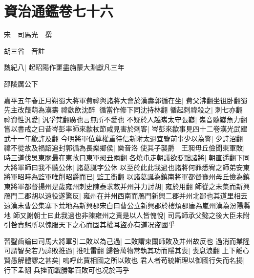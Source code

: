 \section{資治通鑑卷七十六}
宋　司馬光　撰

胡三省　音註

魏紀八|{
	起昭陽作噩盡旃蒙大淵獻凡三年}


邵陵厲公下

嘉平五年春正月朔蜀大將軍費禕與諸將大會於漢夀郭循在坐|{
	費父沸翻坐徂卧翻蜀先主改葭萌為漢夀}
禕歡飲沈醉|{
	循當作修下同沈持林翻}
循起刺禕殺之|{
	刺七亦翻}
禕資性汎愛|{
	汎孚梵翻廣也言無所不愛也}
不疑於人越嶲太守張嶷|{
	嶲音髓嶷魚力翻}
嘗以書戒之曰昔岑彭率師來歙杖節咸見害於刺客|{
	岑彭來歙事見四十二卷漢光武建武十一年歙許及翻}
今明將軍位尊權重待信新附太過宜鑒前事少以為警|{
	少詩沼翻}
禕不從故及禍詔追封郭循為長樂鄉侯|{
	樂音洛}
使其子襲爵　王昶毋丘儉聞東軍敗|{
	時三道伐吳東關最在東故曰東軍昶丑兩翻}
各燒屯走朝議欲貶黜諸將|{
	朝直遥翻下同}
大將軍師曰我不聽公休|{
	諸葛誕字公休}
以至於此此我過也諸將何罪悉宥之師弟安東將軍昭時為監軍唯削昭爵而已|{
	監工銜翻}
以諸葛誕為鎮南將軍都督豫州母丘儉為鎮東將軍都督揚州是歲雍州刺史陳泰求敕并州并力討胡|{
	雍於用翻}
師從之未集而新興鴈門二郡胡以遠役遂驚反|{
	雍州在并州西南而鴈門新興二郡并州北鄙也其道里相去遠漢末曹公集塞下荒地為新興郡宋白曰曹公立新興郡於樓煩郡唐為嵐州漢為汾陽縣地}
師又謝朝士曰此我過也非陳雍州之責是以人皆愧悅|{
	司馬師承父懿之後大臣未附引咎責躬所以愧服天下之心而固其權耳盜亦有道况盗國乎}


習鑿齒論曰司馬大將軍引二敗以為己過|{
	二敗謂東關師敗及并州故反也}
過消而業隆可謂智矣若乃諱敗推過|{
	推吐雷翻}
歸咎萬物常執其功而隱其喪|{
	喪息浪翻}
上下離心賢愚解體謬之甚矣|{
	嗚呼此賈相國之所以敗也}
君人者苟統斯理以御國行失而名揚|{
	行下孟翻}
兵挫而戰勝雖百敗可也况於再乎

